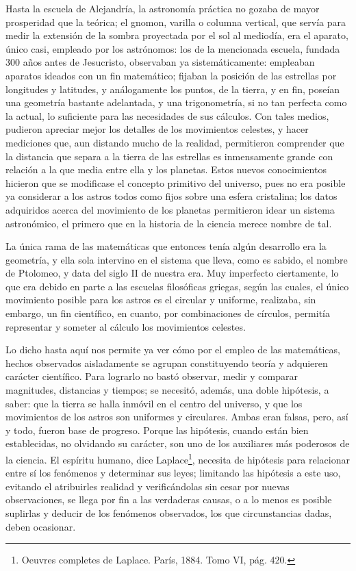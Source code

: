 \documentclass[a4paper, 12pt]{article}
\begin{document}
Hasta la escuela de Alejandría, la astronomía práctica no gozaba de mayor prosperidad que la teórica; el gnomon, varilla o columna vertical, que servía para medir la extensión de la sombra proyectada por el sol al mediodía, era el aparato, único casi, empleado por los astrónomos: los de la mencionada escuela, fundada 300 años antes de Jesucristo, observaban ya sistemáticamente: empleaban aparatos ideados con un fin matemático; fijaban la posición de las estrellas por longitudes y latitudes, y análogamente los puntos, de la tierra, y en fin, poseían una geometría bastante adelantada, y una trigonometría, si no tan perfecta como la actual, lo suficiente para las necesidades de sus cálculos. Con tales medios, pudieron apreciar mejor los detalles de los movimientos celestes, y hacer mediciones que, aun distando mucho de la realidad, permitieron comprender que la distancia que separa a la tierra de las estrellas es inmensamente grande con relación a la que media entre ella y los planetas. Estos nuevos conocimientos hicieron que se modificase el concepto primitivo del universo, pues no era posible ya considerar a los astros todos como fijos sobre una esfera cristalina; los datos adquiridos acerca del movimiento de los planetas permitieron idear un sistema astronómico, el primero que en la historia de la ciencia merece nombre de tal.

La única rama de las matemáticas que entonces tenía algún desarrollo era la geometría, y ella sola intervino en el sistema que lleva, como es sabido, el nombre de Ptolomeo, y data del siglo II de nuestra era. Muy imperfecto ciertamente, lo que era debido en parte a las escuelas filosóficas griegas, según las cuales, el único movimiento posible para los astros es el circular y uniforme, realizaba, sin embargo, un fin científico, en cuanto, por combinaciones de círculos, permitía representar y someter al cálculo los movimientos celestes.

Lo dicho hasta aquí nos permite ya ver cómo por el empleo de las matemáticas, hechos observados aisladamente se agrupan constituyendo teoría y adquieren carácter científico.  Para lograrlo no bastó observar, medir y comparar magnitudes, distancias y tiempos; se necesitó, además, una doble hipótesis, a saber: que la tierra se halla inmóvil en el centro del universo, y que los movimientos de los astros son uniformes y circulares. Ambas eran falsas, pero, así y todo, fueron base de progreso. Porque las hipótesis, cuando están bien establecidas, no olvidando su carácter, son uno de los auxiliares más poderosos de la ciencia. El espíritu humano, dice Laplace\footnote{Oeuvres completes de Laplace. París, 1884. Tomo VI, pág. 420.}, necesita de hipótesis para relacionar entre sí los fenómenos y determinar sus leyes; limitando las hipótesis a este uso, evitando el atribuirles realidad y verificándolas sin cesar por nuevas observaciones, se llega por fin a las verdaderas causas, o a lo menos es posible suplirlas y deducir de los fenómenos observados, los que circunstancias dadas, deben ocasionar.
 
\end{document}
